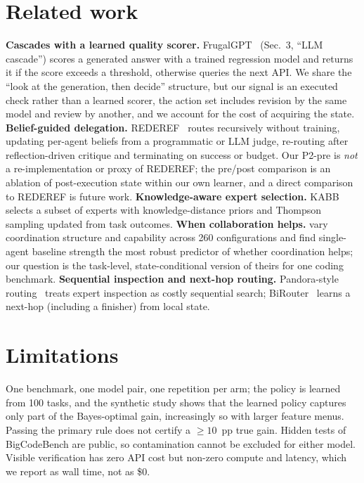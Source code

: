 \documentclass{article}
\newif\ifdraftmode
\newcommand{\draftnote}[1]{\ifdraftmode{\color{red}\textbf{[DRAFT: #1]}}\else\PackageError{main}{draftnote left in submission build: #1}{}\fi}
\begin{document}
\section{Related work}
\label{sec:related}
\textbf{Cascades with a learned quality scorer.} FrugalGPT~\citep{chen2023frugalgpt} (Sec.~3, ``LLM cascade'') scores a generated answer
with a trained regression model and returns it if the score exceeds a threshold, otherwise queries the next API. We share the
``look at the generation, then decide'' structure, but our signal is an executed check rather than a learned scorer, the action set
includes revision by the same model and review by another, and we account for the cost of acquiring the state.
\textbf{Belief-guided delegation.} REDEREF~\citep{hosseini2026rederef} routes recursively without training, updating per-agent beliefs
from a programmatic or LLM judge, re-routing after reflection-driven critique and terminating on success or budget. Our P2-pre is
\emph{not} a re-implementation or proxy of REDEREF; the pre/post comparison is an ablation of post-execution state within our own
learner, and a direct comparison to REDEREF is future work.
\textbf{Knowledge-aware expert selection.} KABB~\citep{zhang2025kabb} selects a subset of experts with knowledge-distance priors and
Thompson sampling updated from task outcomes. \textbf{When collaboration helps.} \citet{kim2026outgrow} vary coordination structure and
capability across 260 configurations and find single-agent baseline strength the most robust predictor of whether coordination helps;
our question is the task-level, state-conditional version of theirs for one coding benchmark. \textbf{Sequential inspection and
next-hop routing.} Pandora-style routing~\citep{fisch2026pandora} treats expert inspection as costly sequential search; BiRouter~\citep{yang2026birouter}
learns a next-hop (including a finisher) from local state. \draftnote{Confirm each citation against
docs/related\_work\_week1.md: which were read in full (arXiv HTML) vs abstract only; Pandora/BiRouter entries are abstract+partial.}

\section{Limitations}
\label{sec:limits}
One benchmark, one model pair, one repetition per arm; the policy is learned from 100 tasks, and the synthetic study shows that the
learned policy captures only part of the Bayes-optimal gain, increasingly so with larger feature menus. Passing the primary rule does
not certify a $\ge 10$~pp true gain. Hidden tests of BigCodeBench are public, so contamination cannot be excluded for either model.
Visible verification has zero API cost but non-zero compute and latency, which we report as wall time, not as \$0.
\draftnote{Add: gate-hold behaviour, incomplete/unknown-cost attribution, what an unconfirmed result would and would not mean.}
\end{document}

